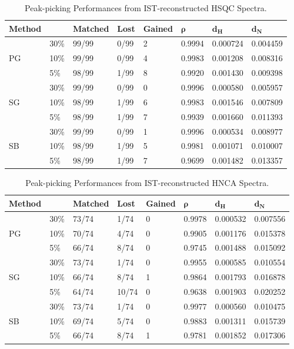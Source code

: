 \begin{table}[h!]
\caption{Peak-picking Performances from IST-reconstructed HSQC Spectra.}
\begin{center}
\begin{tabular}{l l | l l l l l l}
  \hline
  {\bf Method} & & {\bf Matched}       & {\bf Lost}     & {\bf Gained} &
                   $\boldsymbol{\rho}$ & $\mathbf{d_H}$ & $\mathbf{d_N}$ \\
  \hline
     & 30\% & 99/99 & 0/99 & 2 & 0.9994 & 0.000724 & 0.004459 \\
  PG & 10\% & 99/99 & 0/99 & 4 & 0.9983 & 0.001208 & 0.008316 \\
     &  5\% & 98/99 & 1/99 & 8 & 0.9920 & 0.001430 & 0.009398 \\
  \hline
     & 30\% & 99/99 & 0/99 & 0 & 0.9996 & 0.000580 & 0.005957 \\
  SG & 10\% & 98/99 & 1/99 & 6 & 0.9983 & 0.001546 & 0.007809 \\
     &  5\% & 98/99 & 1/99 & 7 & 0.9939 & 0.001660 & 0.011393 \\
  \hline
     & 30\% & 99/99 & 0/99 & 1 & 0.9996 & 0.000534 & 0.008977 \\
  SB & 10\% & 98/99 & 1/99 & 5 & 0.9981 & 0.001071 & 0.010007 \\
     &  5\% & 98/99 & 1/99 & 7 & 0.9699 & 0.001482 & 0.013357 \\
\end{tabular}
\end{center}
\end{table}

\begin{table}[h!]
\caption{Peak-picking Performances from IST-reconstructed HNCA Spectra.}
\begin{center}
\begin{tabular}{l l | l l l l l l}
  \hline
  {\bf Method} & & {\bf Matched}       & {\bf Lost}     & {\bf Gained} &
                   $\boldsymbol{\rho}$ & $\mathbf{d_H}$ & $\mathbf{d_N}$ \\
  \hline
     & 30\% & 73/74 &  1/74 & 0 & 0.9978 & 0.000532 & 0.007556 \\
  PG & 10\% & 70/74 &  4/74 & 0 & 0.9905 & 0.001176 & 0.015378 \\
     &  5\% & 66/74 &  8/74 & 0 & 0.9745 & 0.001488 & 0.015092 \\
  \hline
     & 30\% & 73/74 &  1/74 & 0 & 0.9955 & 0.000585 & 0.010554 \\
  SG & 10\% & 66/74 &  8/74 & 1 & 0.9864 & 0.001793 & 0.016878 \\
     &  5\% & 64/74 & 10/74 & 0 & 0.9638 & 0.001903 & 0.020252 \\
  \hline
     & 30\% & 73/74 &  1/74 & 0 & 0.9977 & 0.000560 & 0.010475 \\
  SB & 10\% & 69/74 &  5/74 & 0 & 0.9883 & 0.001311 & 0.015739 \\
     &  5\% & 66/74 &  8/74 & 1 & 0.9781 & 0.001852 & 0.017306 \\
\end{tabular}
\end{center}
\end{table}

